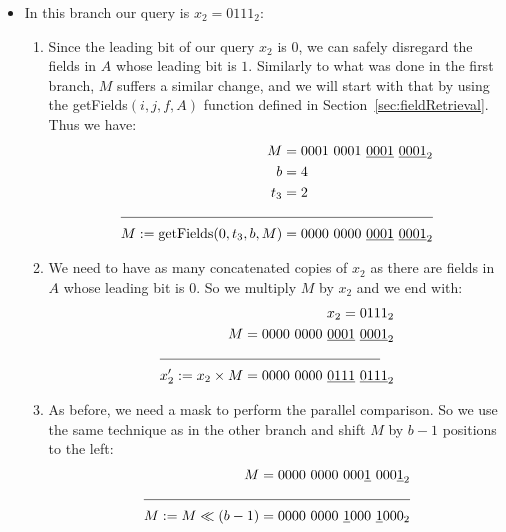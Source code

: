 \begin{itemize}
\begin{enumerate}
    \end{enumerate}
    \item
    In this branch our query is $x_2 = 0111_2$:
    \begin{enumerate}
        \item
        Since the leading bit of our query $x_2$ is $0$, we can safely disregard the fields in $A$ whose leading bit is $1$. Similarly to what was done in the first branch, $M$ suffers a similar change, and we will start with that by using the getFields$(i, j, f, A)$ function defined in Section~\ref{sec:fieldRetrieval}. Thus we have:
        \begin{align*}
            M &= 0001\ 0001\ \underline{0001}\ \underline{0001}_2 \\
            b &= 4 \\
            t_3 &= 2 \\
            \cline{1-2}
            M := \text{getFields}(0, t_3, b, M) &= 0000\ 0000\ \underline{0001}\ \underline{0001}_2 \\
        \end{align*}
        
        \item
        We need to have as many concatenated copies of $x_2$ as there are fields in $A$ whose leading bit is $0$. So we multiply $M$ by $x_2$ and we end with:
        \begin{align*}
            x_2 = 0111_2 \\
            M = 0000\ 0000\ \underline{0001}\ \underline{0001}_2 \\
            \cline{1-2}
            x_2' := x_2 \times M = 0000\ 0000\ \underline{0111}\ \underline{0111}_2 \\
        \end{align*}
        
        \item
        As before, we need a mask to perform the parallel comparison. So we use the same technique as in the other branch and shift $M$ by $b-1$ positions to the left:
        \begin{align*}
            M = 0000\ 0000\ 000\underline{1}\ 000\underline{1}_2& \\
            \cline{1-2}
            M := M \ll (b - 1) = 0000\ 0000\ \underline{1}000\ \underline{1}000_2& \\
        \end{align*}
        

\end{enumerate}
\end{itemize}
